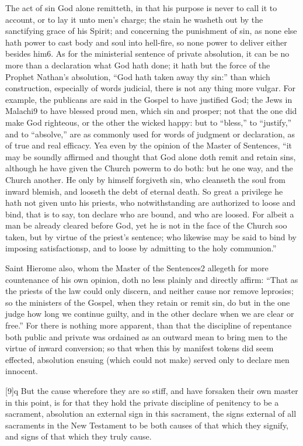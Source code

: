 The act of sin God alone remitteth, in that his purpose is never to call it to account, or to lay it unto men’s charge; the stain he washeth out by the sanctifying grace of his Spirit; and concerning the punishment of sin, as none else hath power to cast body and soul into hell-fire, so none power to deliver either besides him6. As for the ministerial sentence of private absolution, it can be no more than a declaration what God hath done; it hath but the force of the Prophet Nathan’s absolution, “God hath taken away thy sin:” than which construction, especially of words judicial, there is not any thing more vulgar. For example, the publicans are said in the Gospel to have justified God; the Jews in Malachi9 to have blessed proud men, which sin and prosper; not that the one did make God righteous, or the other the wicked happy: but to “bless,” to “justify,” and to “absolve,” are as commonly used for words of judgment or declaration, as of true and real efficacy. Yea even by the  opinion of the Master of Sentences, “it may be soundly affirmed and thought that God alone doth remit and retain sins, although he have given the Church powerm to do both: but he one way, and the Church another. He only by himself forgiveth sin, who cleanseth the soul from inward blemish, and looseth the debt of eternal death. So great a privilege he hath not given unto his priests, who notwithstanding are authorized to loose and bind, that is to say, ton declare who are bound, and who are loosed. For albeit a man be already cleared before God, yet he is not in the face of the Church soo taken, but by virtue of the priest’s sentence; who likewise may be said to bind by imposing satisfactionsp, and to loose by admitting to the holy communion.”

Saint Hierome also, whom the Master of the Sentences2 allegeth for more countenance of his own opinion, doth no less plainly and directly affirm: “That as the priests of the law could only discern, and neither cause nor remove leprosies; so the ministers of the Gospel, when they retain or remit sin, do but in the one judge how long we continue guilty, and in the other declare when we are clear or free.” For there is nothing more apparent, than that the discipline  of repentance both public and private was ordained as an outward mean to bring men to the virtue of inward conversion; so that when this by manifest tokens did seem effected, absolution ensuing (which could not make) served only to declare men innocent.

[9]q But the cause wherefore they are so stiff, and have forsaken their own master in this point, is for that they hold the private discipline of penitency to be a sacrament, absolution an external sign in this sacrament, the signs external of all sacraments in the New Testament to be both causes of that which they signify, and signs of that which they truly cause.


